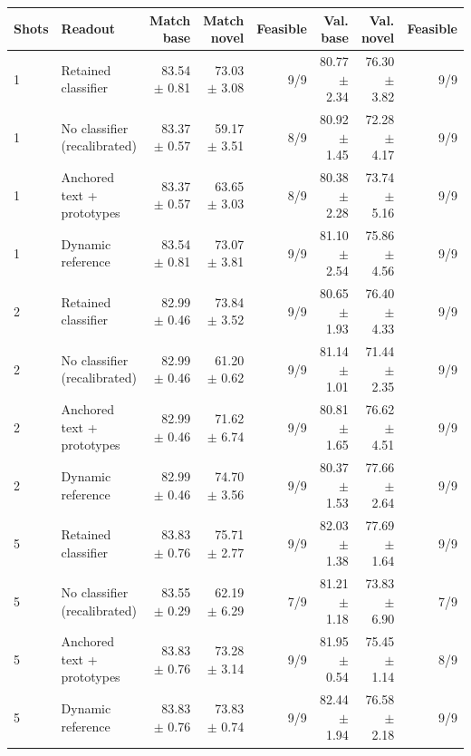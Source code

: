 \begin{tabular}{llrrrrrr}
\toprule
Shots & Readout & Match base & Match novel & Feasible & Val. base & Val. novel & Feasible \\
\midrule
1 & Retained classifier & 83.54 $\pm$ 0.81 & 73.03 $\pm$ 3.08 & 9/9 & 80.77 $\pm$ 2.34 & 76.30 $\pm$ 3.82 & 9/9 \\
1 & No classifier (recalibrated) & 83.37 $\pm$ 0.57 & 59.17 $\pm$ 3.51 & 8/9 & 80.92 $\pm$ 1.45 & 72.28 $\pm$ 4.17 & 9/9 \\
1 & Anchored text + prototypes & 83.37 $\pm$ 0.57 & 63.65 $\pm$ 3.03 & 8/9 & 80.38 $\pm$ 2.28 & 73.74 $\pm$ 5.16 & 9/9 \\
1 & Dynamic reference & 83.54 $\pm$ 0.81 & 73.07 $\pm$ 3.81 & 9/9 & 81.10 $\pm$ 2.54 & 75.86 $\pm$ 4.56 & 9/9 \\
\midrule
2 & Retained classifier & 82.99 $\pm$ 0.46 & 73.84 $\pm$ 3.52 & 9/9 & 80.65 $\pm$ 1.93 & 76.40 $\pm$ 4.33 & 9/9 \\
2 & No classifier (recalibrated) & 82.99 $\pm$ 0.46 & 61.20 $\pm$ 0.62 & 9/9 & 81.14 $\pm$ 1.01 & 71.44 $\pm$ 2.35 & 9/9 \\
2 & Anchored text + prototypes & 82.99 $\pm$ 0.46 & 71.62 $\pm$ 6.74 & 9/9 & 80.81 $\pm$ 1.65 & 76.62 $\pm$ 4.51 & 9/9 \\
2 & Dynamic reference & 82.99 $\pm$ 0.46 & 74.70 $\pm$ 3.56 & 9/9 & 80.37 $\pm$ 1.53 & 77.66 $\pm$ 2.64 & 9/9 \\
\midrule
5 & Retained classifier & 83.83 $\pm$ 0.76 & 75.71 $\pm$ 2.77 & 9/9 & 82.03 $\pm$ 1.38 & 77.69 $\pm$ 1.64 & 9/9 \\
5 & No classifier (recalibrated) & 83.55 $\pm$ 0.29 & 62.19 $\pm$ 6.29 & 7/9 & 81.21 $\pm$ 1.18 & 73.83 $\pm$ 6.90 & 7/9 \\
5 & Anchored text + prototypes & 83.83 $\pm$ 0.76 & 73.28 $\pm$ 3.14 & 9/9 & 81.95 $\pm$ 0.54 & 75.45 $\pm$ 1.14 & 8/9 \\
5 & Dynamic reference & 83.83 $\pm$ 0.76 & 73.83 $\pm$ 0.74 & 9/9 & 82.44 $\pm$ 1.94 & 76.58 $\pm$ 2.18 & 9/9 \\
\bottomrule
\end{tabular}
